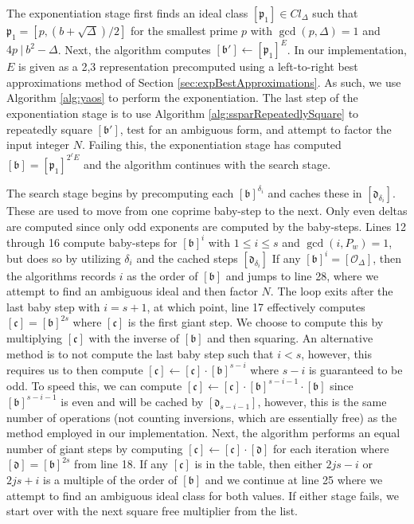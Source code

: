 \documentclass{ucalgthes1}
\theoremstyle{definition}
\newcommand{\ideal}{\mathfrak}
\newcommand{\idealclass}[1]{\left[ \ideal #1 \right]}
\newcommand{\bclass}{\idealclass b}
\newcommand{\cclass}{\idealclass c}
\newcommand{\dclass}{\idealclass d}
\newcommand{\idclass}{[\mathcal O_\Delta]}
\begin{document}
The exponentiation stage first finds an ideal class $\idealclass{p_1} \in Cl_\Delta$ such that $\ideal{p_1} = [p, (b + \sqrt\Delta)/2]$ for the smallest prime $p$ with $\gcd(p, \Delta) = 1$ and $4p ~|~ b^2 - \Delta$. Next, the algorithm computes $\idealclass{b'} \gets \idealclass{p_1}^E$.  In our implementation, $E$ is given as a 2,3 representation precomputed using a left-to-right best approximations method of Section \ref{sec:expBestApproximations}.  As such, we use Algorithm \ref{alg:yaos} to perform the exponentiation.  The last step of the exponentiation stage is to use Algorithm \ref{alg:ssparRepeatedlySquare} to repeatedly square $\idealclass{b'}$, test for an ambiguous form, and attempt to factor the input integer $N$.  Failing this, the exponentiation stage has computed $\bclass = \idealclass{p_1}^{2^\ell E}$ and the algorithm continues with the search stage.

The search stage begins by precomputing each $\bclass^{\delta_i}$ and caches these in $\idealclass{d_{\delta_i}}$.  These are used to move from one coprime baby-step to the next.  Only even deltas are computed since only odd exponents are computed by the baby-steps.  Lines 12 through 16 compute baby-steps for $\bclass^i$ with $1 \le i \le s$ and $\gcd(i, P_w) = 1$, but does so by utilizing $\delta_i$ and the cached steps $\idealclass{d_{\delta_i}}$  If any $\bclass^i = \idclass$, then the algorithms records $i$ as the order of $\bclass$ and jumps to line 28, where we attempt to find an ambiguous ideal and then factor $N$.  The loop exits after the last baby step with $i = s+1$, at which point, line 17 effectively computes $\cclass = \bclass^{2s}$ where $\cclass$ is the first giant step.  We choose to compute this by multiplying $\cclass$ with the inverse of $\bclass$ and then squaring.  An alternative method is to not compute the last baby step such that $i < s$, however, this requires us to then compute $\cclass \gets \cclass \cdot \bclass^{s-i}$ where $s-i$ is guaranteed to be odd.  To speed this, we can compute $\cclass \gets \cclass \cdot \bclass^{s-i-1} \cdot \bclass$ since $\bclass^{s-i-1}$ is even and will be cached by $\idealclass{d_{s-i-1}}$, however, this is the same number of operations (not counting inversions, which are essentially free) as the method employed in our implementation.  Next, the algorithm performs an equal number of giant steps by computing $\cclass \gets \cclass \cdot \dclass$ for each iteration where $\dclass = \bclass^{2s}$ from line 18.  If any $\cclass$ is in the table, then either $2js-i$ or $2js+i$ is a multiple of the order of $\bclass$ and we continue at line 25 where we attempt to find an ambiguous ideal class for both values.  If either stage fails, we start over with the next square free multiplier from the list.
\end{document}
